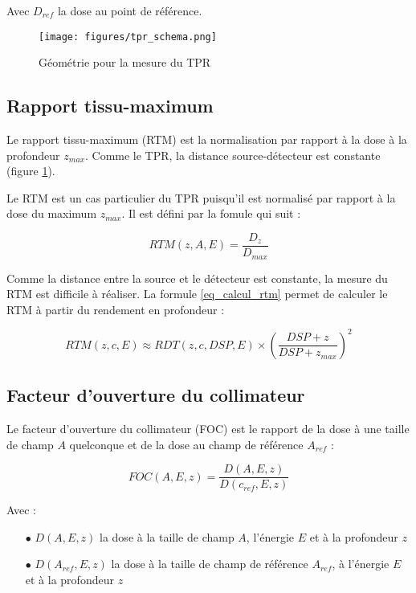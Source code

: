 \documentclass{article}
\begin{document}
Avec $D_{ref}$ la dose au point de référence.

\begin{figure}[h] 
  \centering
  \texttt{[image: figures/tpr\_schema.png]}
  \caption{Géométrie pour la mesure du TPR}
  \label{fig_tpr}
\end{figure}

\subsection{Rapport tissu-maximum}

Le rapport tissu-maximum (RTM) est la normalisation par rapport à la dose à la profondeur $z_{max}$. Comme le TPR, la distance source-détecteur est constante (figure \ref*{fig_tpr}). 

Le RTM est un cas particulier du TPR puisqu'il est normalisé par rapport à la dose du maximum $z_{max}$. Il est défini par la fomule qui suit :

\begin{equation}
    RTM(z, A, E) = \dfrac{D_z}{D_{max}}
    \label{eq_rtm}
\end{equation}

Comme la distance entre la source et le détecteur est constante, la mesure du RTM est difficile à réaliser. La formule \ref{eq_calcul_rtm} permet de calculer le RTM à partir du rendement en profondeur :

\begin{equation}
    RTM(z, c, E) \approx RDT(z, c, DSP, E) \times \left(\dfrac{DSP + z}{DSP + z_{max}}\right)^2
    \label{eq_calcul_rtm}
\end{equation}

\subsection{Facteur d'ouverture du collimateur}

Le facteur d'ouverture du collimateur (FOC) est le rapport de la dose à une taille de champ $A$ quelconque et de la dose au champ de référence $A_{ref}$ :

\begin{equation}
    FOC(A, E, z) = \dfrac{D(A, E, z)}{D(c_{ref}, E, z)}
    \label{eq_foc}
\end{equation}

Avec :

\begin{itemize}
    \item[$\bullet$] $D(A, E, z)$ la dose à la taille de champ $A$, l'énergie $E$ et à la profondeur $z$
    \item[$\bullet$] $D(A_{ref}, E, z)$ la dose à la taille de champ de référence $A_{ref}$, à l'énergie $E$ et à la profondeur $z$
\end{itemize}
\end{document}
